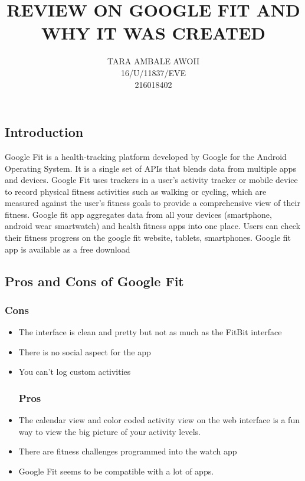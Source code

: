 \documentclass[10pt,a4paper]{report}
\begin{document}
\author{TARA AMBALE AWOII\\
		16/U/11837/EVE\\
		216018402
}
\title{REVIEW ON GOOGLE FIT AND WHY IT WAS CREATED}
\maketitle
	\begin{flushleft}
		\section{Introduction}
			Google Fit is a health-tracking platform developed by Google for the Android Operating System. It is a single set of APIs that blends data from multiple apps and devices. Google Fit uses trackers in a user's activity tracker or mobile device to record physical fitness activities such as walking or cycling, which are measured against the user's fitness goals to provide a comprehensive view of their fitness.\cite{1} \linebreak
			\linebreak
			Google fit app aggregates data from all your devices (smartphone, android wear smartwatch) and health fitness apps into one place. Users can check their fitness progress on the google fit website, tablets, smartphones. \linebreak
			 \linebreak
			 Google fit app is available as a free download\cite{2}\linebreak
			  \linebreak
			  \subsection{Pros and Cons of Google Fit}\cite{3}
			  \subsubsection{Cons}
			  	\begin{itemize}
			  	\item The interface is clean and pretty but not as much as the FitBit interface
			  	\item There is no social aspect for the app
			  	\item You can't log custom activities\linebreak
			  	\linebreak
			  	\subsubsection{Pros}
			  	\item The calendar view and color coded activity view on the web interface is a fun way to view the big picture of your activity levels.
			  	\item There are fitness challenges programmed into the watch app
			  	\item Google Fit seems to be compatible with a lot of apps.\linebreak
			  	\linebreak
			  	

\end{itemize}
\end{flushleft}
\end{document}
